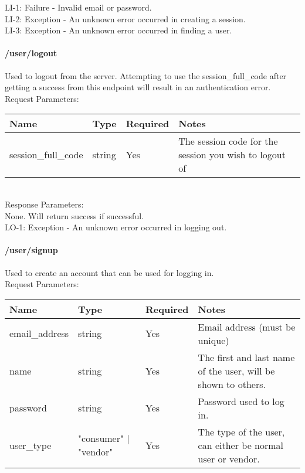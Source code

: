 \documentclass{article}[11pt]
\begin{document}
\ErrorsMysql
LI-1: Failure - Invalid email or password. \\
LI-2: Exception - An unknown error occurred in creating a session. \\
LI-3: Exception - An unknown error occurred in finding a user.



\paragraph{/user/logout}\textbf{}

Used to logout from the server. Attempting to use the session\_full\_code after getting a success from this endpoint will result in an authentication error.  \\

\noindent
Request Parameters:

\noindent
\begin{tabular}{|l|l|l|l|}
\hline
\textbf{Name} & \textbf{Type} & \textbf{Required} & \textbf{Notes} \\
\hline
session\_full\_code & string & Yes & The session code for the session you wish to logout of \\
\hline
\end{tabular} \\

\noindent
Response Parameters: \\
None. Will return success if successful. \\

\ErrorsSession
LO-1: Exception - An unknown error occurred in logging out.

\newpage

\paragraph{/user/signup}\textbf{}

Used to create an account that can be used for logging in.  \\

\noindent
Request Parameters:

\noindent
\begin{tabular}{|l|l|l|l|}
\hline
\textbf{Name} & \textbf{Type} & \textbf{Required} & \textbf{Notes} \\
\hline
email\_address & string & Yes & Email address (must be unique) \\
\hline
name & string & Yes & The first and last name of the user, will be shown to others. \\
\hline
password & string & Yes & Password used to log in. \\
\hline
user\_type & "consumer" $\vert$ "vendor" & Yes & The type of the user, can either be normal user or vendor. \\
\hline
\end{tabular} \\
\end{document}
